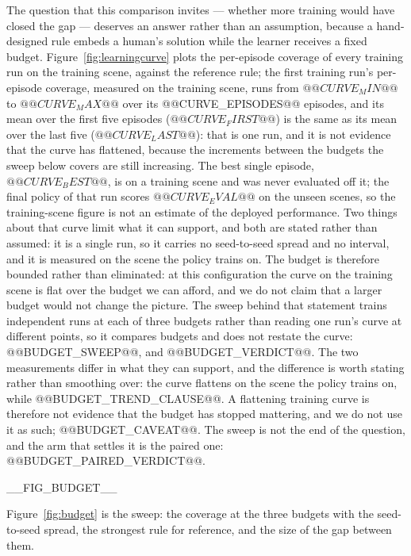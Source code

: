 The question that this comparison invites --- whether more training would
have closed the gap --- deserves an answer rather than an assumption,
because a hand-designed rule embeds a human's solution while the learner
receives a fixed budget.  Figure~\ref{fig:learningcurve} plots the
per-episode coverage of every training run on the training scene, against
the reference rule; the first training run's per-episode coverage,
measured on the training scene, runs from $@@CURVE_MIN@@$ to
$@@CURVE_MAX@@$ over its @@CURVE_EPISODES@@ episodes, and its mean over
the first five episodes ($@@CURVE_FIRST@@$) is the same as its mean over
the last five ($@@CURVE_LAST@@$): that is one run, and it is not evidence
that the curve has flattened, because the increments between the budgets the
sweep below covers are still increasing.  The best single episode,
$@@CURVE_BEST@@$, is on a training scene and was never evaluated off it; the
final policy of that run scores $@@CURVE_EVAL@@$ on the unseen scenes, so the training-scene
figure is not an estimate of the deployed performance.  Two things about
that curve limit what it can support, and both are stated rather than
assumed: it is a single run, so it carries no seed-to-seed spread and no
interval, and it is measured on the scene the policy trains on.  The
budget is therefore bounded rather than eliminated: at this configuration
the curve on the training scene is flat over the budget we can afford, and
we do not claim that a larger budget would not change the picture.  The
sweep behind that statement trains independent runs at each of three
budgets rather than reading one
run's curve at different points, so it compares budgets and does not
restate the curve: @@BUDGET_SWEEP@@, and @@BUDGET_VERDICT@@.  The two
measurements differ in what they can support, and the difference is worth
stating rather than smoothing over: the curve flattens on the scene the
policy trains on, while @@BUDGET_TREND_CLAUSE@@.  A flattening training curve is
therefore not evidence that the budget has stopped mattering, and we do
not use it as such; @@BUDGET_CAVEAT@@.  The sweep is not the end of the
question, and the arm that settles it is the paired one: @@BUDGET_PAIRED_VERDICT@@.

__FIG_BUDGET__

Figure~\ref{fig:budget} is the sweep: the coverage at the three budgets with the seed-to-seed spread, the strongest rule for reference, and the size of the gap between them.

